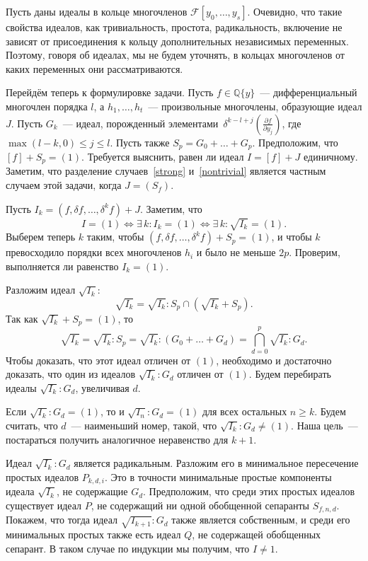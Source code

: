 \documentclass[11pt]{article}
\renewcommand{\le}{\leqslant}
\renewcommand{\ge}{\geqslant}
\newcommand{\diffField}{\mathcal{F}}
\theoremstyle{plain}
\theoremstyle{definition}
\theoremstyle{remark}
\begin{document}
\bigskip

Пусть даны идеалы в кольце многочленов $\diffField[y_0, \ldots, y_s]$.
Очевидно, что такие свойства идеалов, как тривиальность, простота, радикальность, включение
не зависят от присоединения к кольцу дополнительных независимых переменных.
Поэтому, говоря об идеалах, мы не будем уточнять, в кольцах многочленов от каких переменных они рассматриваются.


\bigskip

Перейдём теперь к формулировке задачи.
Пусть $f \in \mathbb{Q}\{y\}$~--- дифференциальный многочлен порядка $l$,
а $h_1, \ldots, h_t$~--- произвольные многочлены, образующие идеал $J$.
Пусть $G_k$~--- идеал, порожденный элементами $\,\delta^{k-l+j} \left(\frac{\partial f}{\partial y_j}\right)$, где $\max(l-k, 0) \le j \le l$.
Пусть также $S_p = G_0 + \ldots + G_p$.
Предположим, что $[f] + S_p = (1)$.
Требуется выяснить, равен ли идеал $I = [f] + J$ единичному.
Заметим, что разделение случаев~\eqref{strong} и~\eqref{nontrivial} является частным случаем этой задачи, когда $J = (S_f)$.

\bigskip


Пусть $I_k = (f, \delta f, \ldots, \delta^k f) + J$. Заметим, что 
$$
 I = (1) \iff \exists \, k: I_k = (1) \iff \exists \, k: \sqrt{I_k} = (1).
$$
Выберем теперь $k$ таким, чтобы $(f, \delta f, \ldots, \delta^k f) + S_p = (1)$, и чтобы $k$ превосходило порядки всех многочленов $h_i$
и было не меньше $2p$.
Проверим, выполняется ли равенство $I_k = (1)$.

Разложим идеал $\sqrt{I_k}$:
$$
 \sqrt{I_k} = \sqrt{I_k} : S_p  \cap  \left(\sqrt{I_k} + S_p\right).
$$
Так как $\sqrt{I_k} + S_p = (1)$, то
$$
 \sqrt{I_k} = \sqrt{I_k} : S_p = \sqrt{I_k} : (G_0 + \ldots + G_d) = \bigcap\limits_{d = 0}^p \sqrt{I_k} : G_d.
$$
Чтобы доказать, что этот идеал отличен от $(1)$, необходимо и достаточно доказать, что один из идеалов $\sqrt{I_k}:G_d$ отличен от $(1)$.
Будем перебирать идеалы $\sqrt{I_k} : G_d$, увеличивая $d$.

Если $\sqrt{I_k} : G_d = (1)$, то и $\sqrt{I_n} : G_d = (1)$ для всех остальных $n \ge k$.
Будем считать, что $d$~--- наименьший номер, такой, что $\sqrt{I_k} : G_d \ne (1)$.
Наша цель~--- постараться получить аналогичное неравенство для $k+1$.

Идеал $\sqrt{I_k} : G_d$ является радикальным. Разложим его в минимальное пересечение простых идеалов $P_{k,d,i}$.
Это в точности минимальные простые компоненты идеала $\sqrt{I_k}$, не содержащие $G_d$.
Предположим, что среди этих простых идеалов существует идеал $P$, не содержащий ни одной обобщенной сепаранты $S_{f,n,d}$.
Покажем, что тогда идеал $\sqrt{I_{k+1}}:G_d$ также является собственным, и среди его минимальных простых также есть идеал $Q$,
не содержащей обобщенных сепарант. В таком случае по индукции мы получим, что $I \ne 1$.
\end{document}
